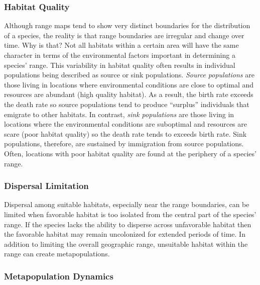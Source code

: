 \documentclass[11pt, hidelinks]{article}
\begin{document}
\subsubsection{Habitat Quality}

Although range maps tend to show very distinct boundaries for the distribution of a species, the reality is that range boundaries are irregular and change over time.  Why is that?  Not all habitats within a certain area will have the same character in terms of the environmental factors important in determining a species' range. This variability in habitat quality often results in individual populations being described as source or sink populations. \emph{Source populations} are those living in locations where environmental conditions are close to optimal and resources are abundant (high quality habitat).  As a result, the birth rate exceeds the death rate so source populations tend to produce ``surplus'' individuals that emigrate to other habitats. In contrast, \emph{sink populations} are those living in locations where the environmental conditions are suboptimal and resources are scare (poor habitat quality) so the death rate tends to exceeds birth rate. Sink populations, therefore, are sustained by immigration from source populations. Often, locations with poor habitat quality are found at the periphery of a species' range.  

\subsubsection{Dispersal Limitation}

Dispersal among suitable habitats, especially near the range boundaries, can be limited when favorable habitat is too isolated from the central part of the species' range.  If the species lacks the ability to disperse across unfavorable habitat then the favorable habitat may remain uncolonized for extended periods of time.  In addition to limiting the overall geographic range, unsuitable habitat within the range can create metapopulations. 

\subsubsection{Metapopulation Dynamics}
\end{document}
